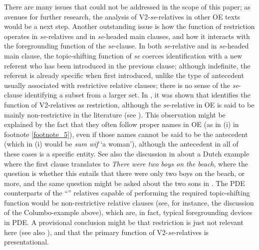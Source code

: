 \documentclass[output=paper,colorlinks,citecolor=brown]{langscibook}
\begin{document}
There are many issues that could not be addressed in the scope of this paper; as avenues for further research, the analysis of V2-\textit{se}{}-relatives in other OE texts would be a next step. Another outstanding issue is how the function of restriction operates in \textit{se}{}-relatives and in \textit{se}{}-headed main clauses, and how it interacts with the foregrounding function of the \textit{se}{}-clause. In both \textit{se}{}-relative and in \textit{se}{}-headed main clause, the topic-shifting function of \textit{se} coerces identification with a new referent who has been introduced in the previous clause; although indefinite, the referent is already specific when first introduced, unlike the type of antecedent usually associated with restrictive relative clauses; there is no sense of the \textit{se}{}-clause identifying a subset from a larger set. In , it was shown that \citet{Gärtner2001} identifies the function of V2-relatives as restriction, although the \textit{se}{}-relative in OE is said to be mainly non-restrictive in the literature (see ). This observation might be explained by the fact that they often follow proper names in OE (as in (i) in footnote \ref{footnote_5}), even if those names cannot be said to be the antecedent (which in (i) would be \textit{sum wif} ‘a woman'), although the antecedent in all of these cases is a specific entity. See also the discussion in \citet{DenDikken2003} about a Dutch example where the first clause translates to \textit{There were two boys on the beach}, where the question is whether this entails that there were only two boys on the beach, or more, and the same question might be asked about the two sons in . The PDE counterparts of the “” relatives capable of performing the required topic-shifting function would be non-restrictive relative clauses (see, for instance, the discussion of the Columbo-example  above), which are, in fact, typical foregrounding devices in PDE. A provisional conclusion might be that restriction is just not relevant here (see also \citealt{DenisonHundt2013}), and that the primary function of V2-\textit{se}{}-relatives is presentational.


\sloppy\printbibliography[heading=subbibliography,notkeyword=this]
\end{document}
